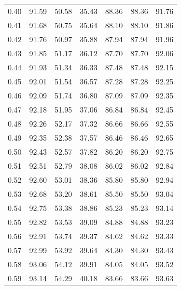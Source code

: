 \begin{tabular}{|c|c|c|c|c|c|c|}
      0.40 &     91.59 &     50.58 &      35.43 &   88.36 &      88.36 &         91.76 \\
      0.41 &     91.68 &     50.75 &      35.64 &   88.10 &      88.10 &         91.86 \\
      0.42 &     91.76 &     50.97 &      35.88 &   87.94 &      87.94 &         91.96 \\
      0.43 &     91.85 &     51.17 &      36.12 &   87.70 &      87.70 &         92.06 \\
      0.44 &     91.93 &     51.34 &      36.33 &   87.48 &      87.48 &         92.15 \\
      0.45 &     92.01 &     51.54 &      36.57 &   87.28 &      87.28 &         92.25 \\
      0.46 &     92.09 &     51.74 &      36.80 &   87.09 &      87.09 &         92.35 \\
      0.47 &     92.18 &     51.95 &      37.06 &   86.84 &      86.84 &         92.45 \\
      0.48 &     92.26 &     52.17 &      37.32 &   86.66 &      86.66 &         92.55 \\
      0.49 &     92.35 &     52.38 &      37.57 &   86.46 &      86.46 &         92.65 \\
      0.50 &     92.43 &     52.57 &      37.82 &   86.20 &      86.20 &         92.75 \\
      0.51 &     92.51 &     52.79 &      38.08 &   86.02 &      86.02 &         92.84 \\
      0.52 &     92.60 &     53.01 &      38.36 &   85.80 &      85.80 &         92.94 \\
      0.53 &     92.68 &     53.20 &      38.61 &   85.50 &      85.50 &         93.04 \\
      0.54 &     92.75 &     53.38 &      38.86 &   85.23 &      85.23 &         93.14 \\
      0.55 &     92.82 &     53.53 &      39.09 &   84.88 &      84.88 &         93.23 \\
      0.56 &     92.91 &     53.74 &      39.37 &   84.62 &      84.62 &         93.33 \\
      0.57 &     92.99 &     53.92 &      39.64 &   84.30 &      84.30 &         93.43 \\
      0.58 &     93.06 &     54.12 &      39.91 &   84.05 &      84.05 &         93.52 \\
      0.59 &     93.14 &     54.29 &      40.18 &   83.66 &      83.66 &         93.63 \\

\end{tabular}
